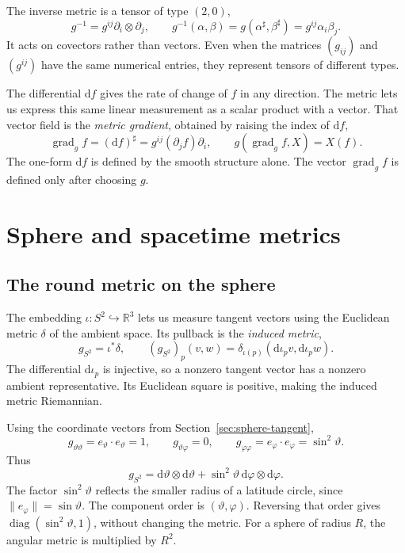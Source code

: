 \documentclass[11pt,a4paper]{article}
\numberwithin{equation}{section}
\newcommand{\R}{\mathbb R}
\newcommand{\dd}{\mathrm d}
\newcommand{\grad}{\operatorname{grad}}
\newcommand{\slideref}[1]{\par\nobreak\smallskip\nobreak{\footnotesize\color{ink!60}\textsc{Source slide #1}}\par\nobreak\smallskip\nobreak}
\begin{document}
The inverse metric is a tensor of type \((2,0)\),
\[
 g^{-1}=g^{ij}\partial_i\otimes\partial_j,
 \qquad
 g^{-1}(\alpha,\beta)=g(\alpha^\sharp,\beta^\sharp)
                     =g^{ij}\alpha_i\beta_j.
\]
It acts on covectors rather than vectors. Even when the matrices
\((g_{ij})\) and \((g^{ij})\) have the same numerical entries, they
represent tensors of different types.

The differential \(\dd f\) gives the rate of change of \(f\) in any
direction. The metric lets us express this same linear measurement as a
scalar product with a vector. That vector field is the \emph{metric
gradient}, obtained by raising the index of \(\dd f\),
\begin{equation}
 \grad_g f=(\dd f)^\sharp
          =g^{ij}(\partial_j f)\partial_i,
 \qquad g(\grad_g f,X)=X(f).
 \label{eq:gradient}
\end{equation}
The one-form \(\dd f\) is defined by the smooth structure alone.
The vector \(\grad_g f\) is defined only after choosing \(g\).

\section{Sphere and spacetime metrics}
\label{sec:examples}
\slideref{19}

\subsection{The round metric on the sphere}
\label{sec:sphere-metric}

The embedding \(\iota:S^2\hookrightarrow\R^3\) lets us measure tangent
vectors using the Euclidean metric \(\delta\) of the ambient space.
Its pullback is the \emph{induced metric},
\[
 g_{S^2}=\iota^*\delta,\qquad
 (g_{S^2})_p(v,w)=\delta_{\iota(p)}(\dd\iota_pv,\dd\iota_pw).
\]
The differential \(\dd\iota_p\) is injective, so a nonzero tangent
vector has a nonzero ambient representative. Its Euclidean square is
positive, making the induced metric Riemannian.

Using the coordinate vectors from Section~\ref{sec:sphere-tangent},
\[
 g_{\vartheta\vartheta}=e_\vartheta\cdot e_\vartheta=1,
 \qquad g_{\vartheta\varphi}=0,
 \qquad g_{\varphi\varphi}=e_\varphi\cdot e_\varphi=\sin^2\vartheta.
\]
Thus
\begin{equation}
 g_{S^2}=\dd\vartheta\otimes\dd\vartheta
          +\sin^2\vartheta\,\dd\varphi\otimes\dd\varphi.
 \label{eq:sphere-metric}
\end{equation}
The factor \(\sin^2\vartheta\) reflects the smaller radius of a
latitude circle, since \(\|e_\varphi\|=\sin\vartheta\).
The component order is \((\vartheta,\varphi)\). Reversing that order
gives \(\operatorname{diag}(\sin^2\vartheta,1)\), without changing
the metric. For a sphere of radius \(R\), the angular metric is
multiplied by \(R^2\).
\end{document}
